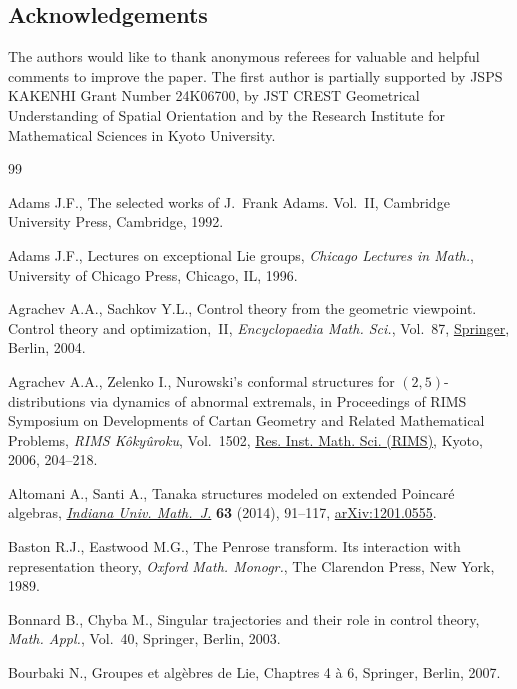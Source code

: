 \documentclass[pdftex]{sigma}
\numberwithin{equation}{section}
\theoremstyle{definition}
\newcommand{\0}{\boldsymbol{0}}
\begin{document}
\subsection*{Acknowledgements}
The authors would like to thank anonymous referees for valuable and helpful comments to improve the paper. The first author is partially supported by JSPS KAKENHI Grant Number 24K06700,
by JST CREST Geometrical Understanding of Spatial Orientation and by
the Research Institute for Mathematical Sciences in Kyoto University.

\begin{thebibliography}{99}
\footnotesize\itemsep=0pt

Adams J.F., The selected works of {J}.~{F}rank {A}dams. {V}ol.~{II}, Cambridge
 University Press, Cambridge, 1992.

Adams J.F., Lectures on exceptional {L}ie groups, \textit{Chicago Lectures in Math.},
 University of Chicago Press, Chicago, IL, 1996.

Agrachev A.A., Sachkov Y.L., Control theory from the geometric viewpoint.
 {C}ontrol theory and optimization,~{II}, \textit{Encyclopaedia Math. Sci.},
 Vol.~87, \href{https://doi.org/10.1007/978-3-662-06404-7}{Springer}, Berlin,
 2004.

Agrachev A.A., Zelenko I., Nurowski's conformal structures for
 $(2,5)$-distributions via dynamics of abnormal extremals, in Proceedings of
 RIMS Symposium on Developments of Cartan Geometry and Related Mathematical
 Problems, \textit{RIMS K\^oky\^uroku}, Vol.~1502,
 \href{https://doi.org/10.2969/aspm/02210413}{Res. Inst. Math. Sci. (RIMS)},
 Kyoto, 2006, 204--218.

Altomani A., Santi A., Tanaka structures modeled on extended {P}oincar\'e
 algebras, \href{https://doi.org/10.1512/iumj.2014.63.5186}{\textit{Indiana
 Univ. Math.~J.}} \textbf{63} (2014), 91--117,
 \href{http://arxiv.org/abs/1201.0555}{arXiv:1201.0555}.

Baston R.J., Eastwood M.G., The {P}enrose transform. Its interaction with
 representation theory, \textit{Oxford Math. Monogr.}, The Clarendon Press, New York,
 1989.

Bonnard B., Chyba M., Singular trajectories and their role in control theory,
 \textit{Math. Appl.}, Vol.~40, Springer, Berlin, 2003.

Bourbaki N., Groupes et alg\`ebres de Lie, Chaptres 4 \`a 6, Springer, Berlin,
 2007.


\end{thebibliography}
\end{document}
